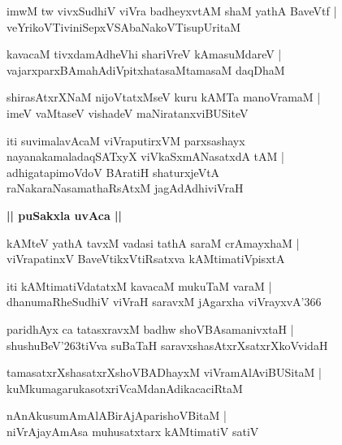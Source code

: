 \documentclass[twoside,12pt,openright]{book}
\def\S{\char'263}
\newcounter{shloka}[chapter]
\def\uvaca#1{\centerline{{\large\textbf{#1}}}}
\begin{document}
\begin{shloka}%
imwM tw vivxSudhiV viVra badheyxvtAM shaM yathA BaveVtf |\\
veYrikoVTiviniSepxVSAbaNakoVTisupUritaM 
\end{shloka}

\begin{shloka}%
kavacaM tivxdamAdheVhi shariVreV kAmasuMdareV |\\
vajarxparxBAmahAdiVpitxhatasaMtamasaM daqDhaM 
\end{shloka}

\begin{shloka}%
shirasAtxrXNaM nijoVtatxMseV kuru kAMTa manoVramaM |\\
imeV vaMtaseV vishadeV maNiratanxviBUSiteV 
\end{shloka}

\begin{shloka}%
iti suvimalavAcaM viVraputirxVM parxsashayx \\
nayanakamaladaqSATxyX viVkaSxmANasatxdA tAM |\\
adhigatapimoVdoV BAratiH shaturxjeVtA \\
raNakaraNasamathaRsAtxM jagAdAdhiviVraH
\end{shloka}

\uvaca{|| puSakxla uvAca ||}

\begin{shloka}%
kAMteV yathA tavxM vadasi tathA saraM crAmayxhaM |\\
viVrapatinxV BaveVtikxVtiRsatxva kAMtimatiVpisxtA 
\end{shloka}

\begin{shloka}%
iti kAMtimatiVdatatxM kavacaM mukuTaM varaM |\\
dhanumaRheSudhiV viVraH saravxM jAgarxha viVrayxvA\char'366
\end{shloka}

\begin{shloka}%
paridhAyx ca tatasxravxM badhw shoVBAsamanivxtaH |\\
shushuBeV\S tiVva suBaTaH saravxshasAtxrXsatxrXkoVvidaH 
\end{shloka}

\begin{shloka}%
tamasatxrXshasatxrXshoVBADhayxM viVramAlAviBUSitaM |\\
kuMkumagarukasotxriVcaMdanAdikacaciRtaM 
\end{shloka}

\begin{shloka}%
nAnAkusumAmAlABirAjAparishoVBitaM |\\
niVrAjayAmAsa muhusatxtarx kAMtimatiV satiV 
\end{shloka}
\end{document}

